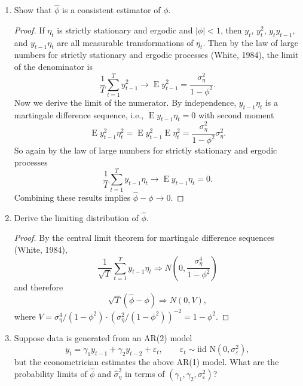 \documentclass[oneside,reqno]{amsart}
\DeclareMathOperator{\E}{E}
\newcommand{\eps}{\varepsilon}
\theoremstyle{definition}
\begin{document}
\begin{enumerate}
\item
Show that $\hat \phi$ is a consistent estimator of $\phi$.

\begin{proof}
If $\eta_t$ is strictly stationary and ergodic and $|\phi| <1$, then $y_t$, $y_t^2$, $y_ty_{t-1}$, and $y_{t-1} \eta_t$ are all measurable transformations of $\eta_t$. Then by the law of large numbers for strictly stationary and ergodic processes (White, 1984), the limit of the denominator is
\[
	\frac{1}{T}\sum_{t=1}^T y_{t-1}^2 \to \E y_{t-1}^2 = \frac{\sigma_\eta^2}{1-\phi^2}.
\] 
Now we derive the limit of the numerator. By independence, $y_{t-1} \eta_t$ is a martingale difference sequence, i.e., $\E y_{t-1} \eta_t = 0$ with second moment
\[
	\E y_{t-1}^2\eta_t^2 =\E y_{t-1}^2 \E \eta_t^2 =\frac{\sigma_\eta^2}{1-\phi^2} \sigma_\eta^2.
\]
So again by the law of large numbers for strictly stationary and ergodic processes 
\[
	\frac{1}{T}\sum_{t=1}^T y_{t-1}\eta_t \to \E y_{t-1}\eta_t = 0.
\]
Combining these results implies $\hat \phi - \phi \to 0$.
\end{proof}

\item
Derive the limiting distribution of $\hat\phi$.

\begin{proof}
By the central limit theorem for martingale difference sequences (White, 1984), 
\[
	\frac{1}{\sqrt T} \sum_{t=1}^T y_{t-1}\eta_t \Rightarrow N\left(0, \frac{\sigma_\eta^4}{1-\phi^2} \right)
\]
and therefore
\[
	\sqrt T(\hat \phi - \phi) \Rightarrow N(0, V),
\]
where $V = \sigma_\eta^4/(1-\phi^2) \cdot (\sigma_\eta^{2}/(1-\phi^2))^{-2} = 1-\phi^2$.
\end{proof}

\item
Suppose data is generated from an AR(2) model 
\begin{equation}\label{eq:4}
	y_t = \gamma_1 y_{t-1} + \gamma_2 y_{t-2} + \eps_t, \qquad \eps_t \sim \text{iid N}(0, \sigma_\eps^2),
\end{equation}
but the econometrician estimates the above AR(1) model. What are the probability limits of $\hat \phi$ and $\hat\sigma_\eta^2$ in terms of $(\gamma_1, \gamma_2, \sigma_\eps^2)$?


\end{enumerate}
\end{document}
